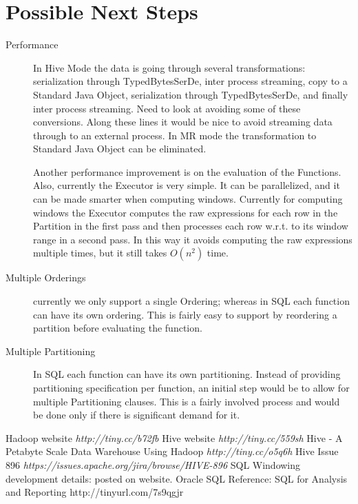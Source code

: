 \documentclass[pdftex,10pt,a4paper]{article}
\begin{document}
\section{Possible Next Steps}
\begin{description}
\item[Performance]  In Hive Mode the data is going through several transformations: serialization through TypedBytesSerDe, inter process streaming, copy to a Standard Java Object, serialization through TypedBytesSerDe, and finally inter process streaming. Need to look at avoiding some of these conversions. Along these lines it would be nice to avoid streaming data through to an external process. In MR mode the transformation to Standard Java Object can be eliminated.

Another performance improvement is on the evaluation of the Functions.  Also, currently the Executor is very simple. It can be parallelized, and it can be made smarter when computing windows. Currently for computing windows the Executor computes the raw expressions for each row in the Partition in the first pass and then processes each row w.r.t. to its window range in a second pass. In this way it avoids computing the raw expressions multiple times, but it still takes $O(n^2)$  time.
\item[Multiple Orderings] currently we only support a single Ordering; whereas in SQL each function can have its own ordering.  This is fairly easy to support by reordering a partition before evaluating the function.
\item[Multiple Partitioning] In SQL each function can have its own partitioning.  Instead of providing partitioning specification per function, an initial step would be to allow for multiple Partitioning clauses.  This is a fairly involved process and would be done only if there is significant demand for it.

\end{description}
  
  \begin{thebibliography}{Dillon 83}
    Hadoop website {\em http://tiny.cc/b72fb}
    Hive website {\em http://tiny.cc/559sh}
    Hive - A Petabyte Scale Data Warehouse Using Hadoop {\em http://tiny.cc/o5q6h}
    Hive Issue 896 {\em
       https://issues.apache.org/jira/browse/HIVE-896}
    SQL Windowing development details:
     posted on website.
      Oracle SQL Reference: SQL for Analysis and Reporting http://tinyurl.com/7s9qgjr
  \end{thebibliography}
\end{document}
